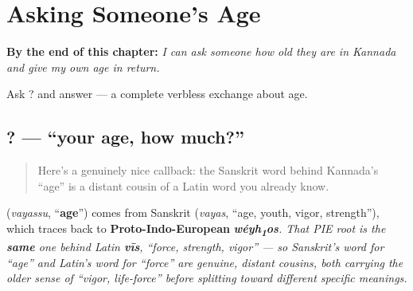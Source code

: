 
\chapter{Asking Someone's Age}
\label{ch:ka-asking-age}

\begin{chapteropening}
\textbf{By the end of this chapter:} \emph{I can ask someone how old they are in Kannada and give my own age in return.}

Ask   ? and answer    — a complete verbless exchange about age.
\end{chapteropening}

\section[\texorpdfstring{\kn{ನಿನ್ನ} \kn{ವಯಸ್ಸು} \kn{ಎಷ್ಟು}? (ninna vayassu eṣṭu?)}{ನಿನ್ನ ವಯಸ್ಸು ಎಷ್ಟು? (ninna vayassu eṣṭu?)}]{  ? — \textquotedblleft{}your age, how much?\textquotedblright{}}

\label{lesson:KA-C19-vayassu}



\begin{quote}
Here's a genuinely nice callback: the Sanskrit word behind Kannada's \textquotedblleft{}age\textquotedblright{} is a distant cousin of a Latin word you already know.
\end{quote}

\begin{cousinweb}
\textbf{} (\emph{vayassu}, \textquotedblleft{}\textbf{age}\textquotedblright{}) comes from Sanskrit \textbf{} (\emph{vayas}, \textquotedblleft{}age, youth, vigor, strength\textquotedblright{}), which traces back to \textbf{Proto-Indo-European} \emph{\textbf{wéyh\textsubscript{1}os}. That PIE root is the \textbf{same} one behind Latin \textbf{vīs}, \textquotedblleft{}force, strength, vigor\textquotedblright{} — so Sanskrit's word for \textquotedblleft{}age\textquotedblright{} and Latin's word for \textquotedblleft{}force\textquotedblright{} are genuine, distant cousins, both carrying the older sense of \textquotedblleft{}vigor, life-force\textquotedblright{} before splitting toward different specific meanings.}
\end{cousinweb}

